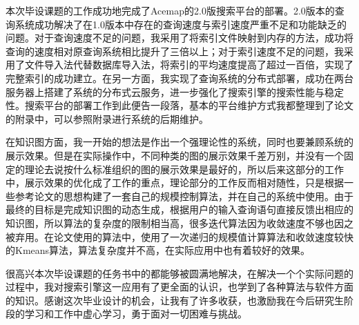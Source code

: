 
\begin{summary}

本次毕设课题的工作成功地完成了Acemap的2.0版搜索平台的部署。2.0版本的查询系统成功解决了在1.0版本中存在的查询速度与索引速度严重不足和功能缺乏的问题。对于查询速度不足的问题，我采用了将索引文件映射到内存的方法，成功将查询的速度相对原查询系统相比提升了三倍以上；对于索引速度不足的问题，我采用了文件导入法代替数据库导入法，将索引的平均速度提高了超过一百倍，实现了完整索引的成功建立。在另一方面，我实现了查询系统的分布式部署，成功在两台服务器上搭建了系统的分布式云服务，进一步强化了搜索引擎的搜索性能与稳定性。搜索平台的部署工作到此便告一段落，基本的平台维护方式我都整理到了论文的附录中，可以参照附录进行系统的后期维护。

在知识图方面，我一开始的想法是作出一个强理论性的系统，同时也要兼顾系统的展示效果。但是在实际操作中，不同种类的图的展示效果千差万别，并没有一个固定的理论去说按什么标准组织的图的展示效果是最好的，所以后来这部分的工作中，展示效果的优化成了工作的重点，理论部分的工作反而相对随性，只是根据一些参考论文的思想构建了一套自己的规模控制算法，并在自己的系统中使用。由于最终的目标是完成知识图的动态生成，根据用户的输入查询语句直接反馈出相应的知识图，所以算法的复杂度的限制相当高，很多迭代算法因为收敛速度不够也因之被弃用。在论文使用的算法中，使用了一次递归的规模值计算算法和收敛速度较快的Kmeans算法，算法复杂度并不高，在实际应用中也有着较好的效果。

很高兴本次毕设课题的任务书中的都能够被圆满地解决，在解决一个个实际问题的过程中，我对搜索引擎这一应用有了更全面的认识，也学到了各种算法与软件方面的知识。感谢这次毕业设计的机会，让我有了许多收获，也激励我在今后研究生阶段的学习和工作中虚心学习，勇于面对一切困难与挑战。
\end{summary}
